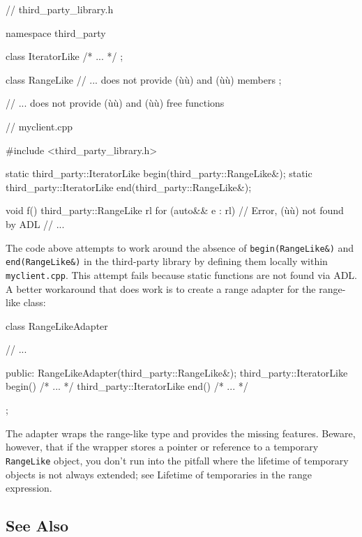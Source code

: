 {{{\begin{emcppslisting}
// third_party_library.h

namespace third_party
{

    class IteratorLike { /* ... */ };

    class RangeLike
    {
        // ... does not provide (ù{}ù) and (ù{}ù) members
    };

    // ... does not provide (ù{}ù) and (ù{}ù) free functions
}
\end{emcppslisting}
\newpage%
\begin{emcppslisting}
// myclient.cpp

#include <third_party_library.h>

static third_party::IteratorLike begin(third_party::RangeLike&);
static third_party::IteratorLike end(third_party::RangeLike&);

void f()
{
    third_party::RangeLike rl
    for (auto&& e : rl)  // Error, (ù{}ù) not found by ADL
    {
        // ...
    }
}
\end{emcppslisting}
    

\noindent The code above attempts to work around the absence of
\lstinline!begin(RangeLike&)! and \lstinline!end(RangeLike&)! in the
third-party library by defining them locally within
\lstinline!myclient.cpp!. This attempt fails because static functions are
not found via ADL. A better workaround that does work is to create a
range adapter for the range-like class:

\begin{emcppslisting}
class RangeLikeAdapter
{
    // ...

public:
    RangeLikeAdapter(third_party::RangeLike&);
    third_party::IteratorLike begin() { /* ... */ }
    third_party::IteratorLike end()   { /* ... */ }
};
\end{emcppslisting}
    

\noindent The adapter wraps the range-like type and provides the missing features.
Beware, however, that if the wrapper stores a pointer or reference to a
temporary \lstinline!RangeLike! object, you don't run into the pitfall
where the lifetime of temporary objects is not always extended; see
{Lifetime of temporaries in the range expression}.

\subsection[See Also]{See Also}\label{see-also}

}}}
